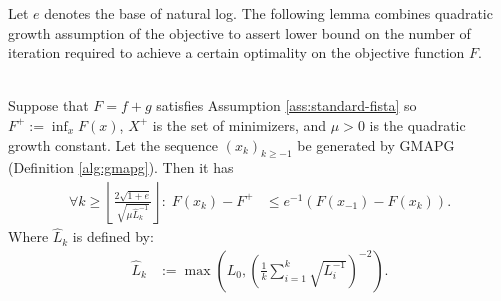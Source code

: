 \documentclass[12pt]{report}
\begin{document}
        Let $e$ denotes the base of natural log. 
        The following lemma combines quadratic growth assumption of the objective to assert lower bound on the number of iteration required to achieve a certain optimality on the objective function $F$. 
        \begin{lemma}\;\label{lemma:prog-ratio}\\
            Suppose that $F = f + g$ satisfies Assumption \ref{ass:standard-fista} so $F^+ := \inf_xF(x)$, $X^+$ is the set of minimizers, and $\mu > 0$ is the quadratic growth constant. 
            Let the sequence $(x_k)_{k \ge -1}$ be generated by GMAPG (Definition \ref{alg:gmapg}). 
            Then it has
            \begin{align*}
                \forall k \ge \left\lfloor \frac{2\sqrt{1 + e}}{\sqrt{\mu\widehat L_k^{-1}}}\right\rfloor:\; 
                F(x_k) - F^+  &\le e^{-1} (F(x_{-1}) - F(x_k)). 
            \end{align*} 
            Where $\widehat L_k$ is defined by:
            \begin{align*}
                \widehat L_k &:= \max\left(
                    L_0, \left(
                        \frac{1}{k} \sum_{i = 1}^{k} \sqrt{L_i^{-1}}
                    \right)^{-2}
                \right). 
            \end{align*}
        \end{lemma}
\end{document}
